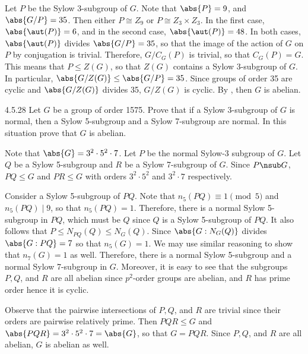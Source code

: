 \begin{sol}
	Let $P$ be the Sylow 3-subgroup of $G$.
	Note that $\abs{P} = 9$, and $\abs{G/P} = 35$.
	Then either $P \cong Z_9$ or $P \cong Z_3 \times Z_3$.
	In the first case, $\abs{\aut(P)} = 6$, and in the second case, $\abs{\aut(P)} = 48$.
	In both cases, $\abs{\aut(P)}$ divides $\abs{G/P} = 35$, so that the image of the action of $G$ on $P$ by conjugation is trivial.
	Therefore, $G/C_G(P)$ is trivial, so that $C_G(P) = G$.
	This means that $P \leq Z(G)$, so that $Z(G)$ contains a Sylow 3-subgroup of $G$.
	In particular, $\abs{G/Z(G)} \leq \abs{G/P} = 35$.
	Since groups of order 35 are cyclic and $\abs{G/Z(G)}$ divides 35, $G/Z(G)$ is cyclic.
	By , then $G$ is abelian.
\end{sol}

\begin{exercise}{4.5.28}
	Let $G$ be a group of order 1575.
	Prove that if a Sylow 3-subgroup of $G$ is normal, then a Sylow 5-subgroup and a Sylow 7-subgroup are normal.
	In this situation prove that $G$ is abelian.
\end{exercise}

\begin{sol}
	Note that $\abs{G} = 3^2 \cdot 5^2 \cdot 7$.
	Let $P$ be the normal Sylow-3 subgroup of $G$.
	Let $Q$ be a Sylow 5-subgroup and $R$ be a Sylow 7-subgroup of $G$.
	Since $P \nsub G$, $PQ \leq G$ and $PR \leq G$ with orders $3^2 \cdot 5^2$ and $3^2 \cdot 7$ respectively. 

	Consider a Sylow 5-subgroup of $PQ$.
	Note that $n_5(PQ) \equiv 1 \pmod 5$ and $n_5(PQ) \mid 9$, so that $n_5(PQ) = 1$.
	Therefore, there is a normal Sylow 5-subgroup in $PQ$, which must be $Q$ since $Q$ is a Sylow 5-subgroup of $PQ$.
	It also follows that $P \leq N_{PQ}(Q) \leq N_G(Q)$.
	Since $\abs{G : N_G(Q)}$ divides $\abs{G : PQ} = 7$ so that $n_5(G) = 1$.
	We may use similar reasoning to show that $n_7(G) = 1$ as well.
	Therefore, there is a normal Sylow 5-subgroup and a normal Sylow 7-subgroup in $G$.
	Moreover, it is easy to see that the subgroups $P, Q$, and $R$ are all abelian since $p^2$-order groups are abelian, and $R$ has prime order hence it is cyclic.

	Observe that the pairwise intersections of $P, Q$, and $R$ are trivial since their orders are pairwise relatively prime.
	Then $PQR \leq G$ and $\abs{PQR} = 3^2 \cdot 5^2 \cdot 7 = \abs{G}$, so that $G = PQR$.
	Since $P, Q$, and $R$ are all abelian, $G$ is abelian as well.
\end{sol}

